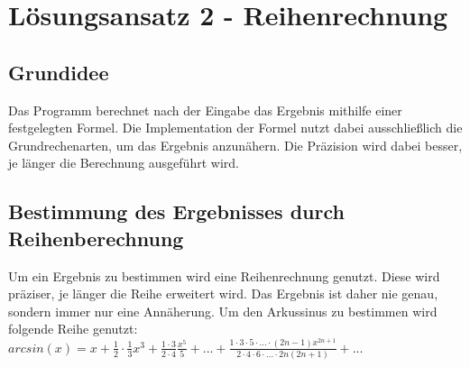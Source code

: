 \documentclass{article}
\begin{document}
	\iffalse
	DIES IST EIN KOMMENTAR UND WIRD VON LATEX NICHT AUSGEFÜHRT
	Diese Punkte sind im darüberliegenden Absatz ausgeführt
	Mapping von x-Werten zu möglichst genauen y-Werten durch Interpolation.
	Welche Precision ist das Ziel? Vorschlag: Prototypen mit kleinen Präzisionen. Außerdem: Einarbeitung in den FPU-Befehlssatz und dessen Funktionsweise.


	Lineare Interpolation ist durch kleinen Input-Bereich und präzisem und großem Lookup-Table vollkommen ausreichend.
	Somit sollte auch das Ergebnis präzise genug sein.

	Wie funktioniert die Interpolation? Was sind y1, y2 usw.? Muss genau aufgeführt werden, um die Formel zu erklären


	\noindent Formel für Lineare Interpolation wobei $x$ der Eingabewert und $y$ der gesuchte Wert sind:\\

	\noindent $ y = y_1 + \frac{y_2-y_1}{x_2-x_1} \cdot (x - x_1) $

	\noindent Umwandlung von x als Eingabewert := $-1 \leq x \leq 1$  in einen in den Lookup-Table einsetzbaren Wert.
	$ x = x + 1 \rightarrow 0 \leq x \leq 2$\\
	Skalierung von x: $ x = x \cdot 10000 \rightarrow 0 \leq x \leq 20000 $\\

	\fi

\section{Lösungsansatz 2 - Reihenrechnung}

	\subsection{Grundidee}
		Das Programm berechnet nach der Eingabe das Ergebnis mithilfe einer festgelegten Formel. Die Implementation der Formel nutzt dabei ausschließlich die Grundrechenarten, um das Ergebnis anzunähern. Die Präzision wird dabei besser, je länger die Berechnung ausgeführt wird.\\

	\subsection{Bestimmung des Ergebnisses durch Reihenberechnung}
		Um ein Ergebnis zu bestimmen wird eine Reihenrechnung genutzt. Diese wird präziser, je länger die Reihe erweitert wird. Das Ergebnis ist daher nie genau, sondern immer nur eine Annäherung. Um den Arkussinus zu bestimmen wird folgende Reihe genutzt:\\
		$arcsin(x) = x+\frac{1}{2} \cdot \frac{1}{3}x^3 + \frac{1 \cdot 3}{2 \cdot 4}\frac{x^5}{5} + ... + \frac{1\cdot3\cdot5\cdot...\cdot(2n-1)x^{2n+1}}{2\cdot4\cdot6\cdot...\cdot2n(2n+1)} + ...$\\
\end{document}

